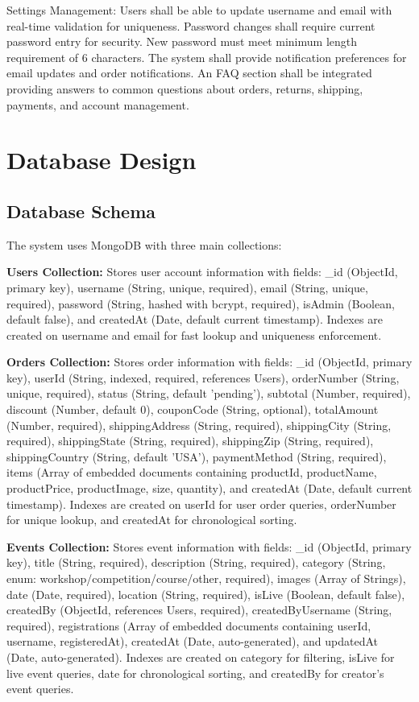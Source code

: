 ﻿\documentclass[11pt]{article}
\begin{document}
Settings Management: Users shall be able to update username and email with real-time validation for uniqueness. Password changes shall require current password entry for security. New password must meet minimum length requirement of 6 characters. The system shall provide notification preferences for email updates and order notifications. An FAQ section shall be integrated providing answers to common questions about orders, returns, shipping, payments, and account management.

\section{Database Design}

\subsection{Database Schema}
The system uses MongoDB with three main collections:

\textbf{Users Collection:} Stores user account information with fields: \_id (ObjectId, primary key), username (String, unique, required), email (String, unique, required), password (String, hashed with bcrypt, required), isAdmin (Boolean, default false), and createdAt (Date, default current timestamp). Indexes are created on username and email for fast lookup and uniqueness enforcement.

\textbf{Orders Collection:} Stores order information with fields: \_id (ObjectId, primary key), userId (String, indexed, required, references Users), orderNumber (String, unique, required), status (String, default 'pending'), subtotal (Number, required), discount (Number, default 0), couponCode (String, optional), totalAmount (Number, required), shippingAddress (String, required), shippingCity (String, required), shippingState (String, required), shippingZip (String, required), shippingCountry (String, default 'USA'), paymentMethod (String, required), items (Array of embedded documents containing productId, productName, productPrice, productImage, size, quantity), and createdAt (Date, default current timestamp). Indexes are created on userId for user order queries, orderNumber for unique lookup, and createdAt for chronological sorting.

\textbf{Events Collection:} Stores event information with fields: \_id (ObjectId, primary key), title (String, required), description (String, required), category (String, enum: workshop/competition/course/other, required), images (Array of Strings), date (Date, required), location (String, required), isLive (Boolean, default false), createdBy (ObjectId, references Users, required), createdByUsername (String, required), registrations (Array of embedded documents containing userId, username, registeredAt), createdAt (Date, auto-generated), and updatedAt (Date, auto-generated). Indexes are created on category for filtering, isLive for live event queries, date for chronological sorting, and createdBy for creator's event queries.
\end{document}
